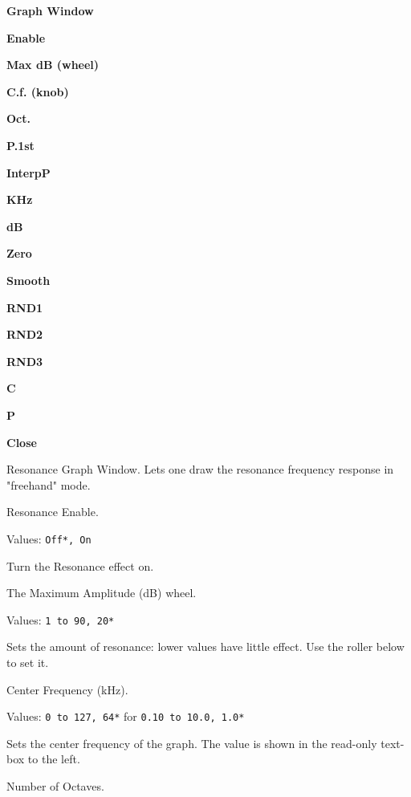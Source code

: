    \begin{enumber}
      \item \textbf{Graph Window}
      \item \textbf{Enable}
      \item \textbf{Max dB (wheel)}
      \item \textbf{C.f. (knob)}
      \item \textbf{Oct.}
      \item \textbf{P.1st}
      \item \textbf{InterpP}
      \item \textbf{KHz}
      \item \textbf{dB}
      \item \textbf{Zero}
      \item \textbf{Smooth}
      \item \textbf{RND1}
      \item \textbf{RND2}
      \item \textbf{RND3}
      \item \textbf{C}
      \item \textbf{P}
      \item \textbf{Close}
   \end{enumber}

   \setcounter{ItemCounter}{0}      %

   Resonance Graph Window.
   Lets one draw the resonance frequency response in "freehand" mode.

   Resonance Enable.

   Values: \texttt{Off*, On}

   Turn the Resonance effect on.

   The Maximum Amplitude (dB) wheel.

   Values: \texttt{1 to 90, 20*}

   Sets the amount of resonance: lower values have little effect. Use the
   roller below to set it. 

   Center Frequency (kHz).

   Values: \texttt{0 to 127, 64*} for \texttt{0.10 to 10.0, 1.0*}

   Sets the center frequency of the graph.
   The value is shown in the read-only text-box to the left.

   Number of Octaves.


